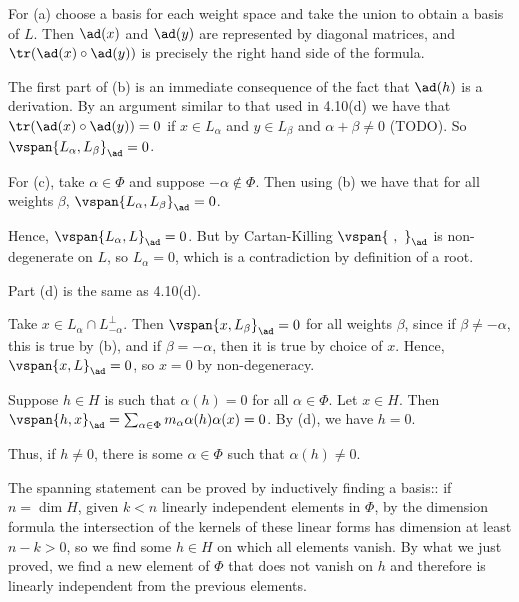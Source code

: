 For (a) choose a basis for each weight space and take the union to obtain
a basis of $L$. Then $\ad(x)$ and $\ad(y)$ are represented by diagonal matrices,
and $\tr(\ad(x) \circ \ad(y))$ is precisely the right hand side of the formula.

The first part of (b) is an immediate consequence of the fact that $\ad(h)$ is a
derivation. By
an argument similar to that used in 4.10(d) we have that
$\tr(\ad(x) \circ \ad(y)) = 0$ if $x \in L_{\alpha}$ and $y \in L_{\beta}$ and
$\alpha+\beta\neq 0$ (TODO). So $\vspan{L_\alpha, L_{\beta}}_{\ad} = 0$.

For (c), take $\alpha \in \Phi$ and suppose $-\alpha \notin \Phi$. Then using (b) we
have that for all weights $\beta$, $\vspan{L_\alpha, L_\beta}_{\ad} = 0$.

Hence, $\vspan{L_{\alpha}, L}_{\ad} = 0$. But by Cartan-Killing
$\vspan{\ ,\ }_{\ad}$ is non-degenerate on $L$, so $L_{\alpha} = 0$, which is
a contradiction by definition of a root.

Part (d) is the same as 4.10(d).

Take $x \in L_\alpha \cap L_{-\alpha}^\perp$. Then
$\vspan{x, L_\beta}_{\ad} = 0$ for all weights $\beta$, since if $\beta \neq -\alpha$,
this is true by (b), and  if $\beta = -\alpha$, then it is true by
choice of $x$. Hence, $\vspan{x, L}_{\ad} = 0$, so $x = 0$ by non-degeneracy.

Suppose $h \in H$ is such that $\alpha(h) = 0$ for all $\alpha \in \Phi$. Let
$x \in H$. Then $\vspan{h, x}_{\ad} = \sum_{\alpha \in \Phi}m_\alpha\alpha(h)\alpha(x) = 0$.
By (d), we have $h = 0$.

Thus, if $h\neq 0$, there is some $\alpha \in\Phi$ such that $\alpha(h)\neq 0$.

The spanning statement can be proved by inductively finding a basis::
if $n = \dim H$, given
$k < n$ linearly independent elements in $\Phi$, by the dimension formula the
intersection of the kernels
of these linear forms has dimension at least $n - k > 0$, so we find some $h \in H$ on
which all elements vanish. By what we just proved, we find a new element of
$\Phi$ that does not vanish on $h$ and therefore is linearly independent from
the previous elements.
